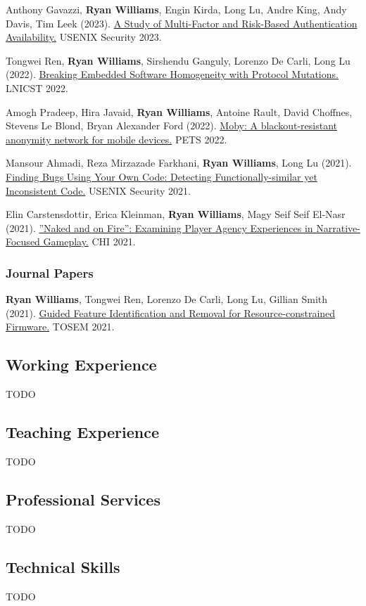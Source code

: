 \documentclass[11pt]{article}
\begin{document}
Anthony Gavazzi, \textbf{Ryan Williams}, Engin Kirda, Long Lu, Andre King, Andy Davis, Tim Leek (2023).
\href{https://www.usenix.org/system/files/sec23summer_41-gavazzi-prepub.pdf}{A Study of Multi-Factor and Risk-Based Authentication Availability.}
USENIX Security 2023.

Tongwei Ren, \textbf{Ryan Williams}, Sirshendu Ganguly, Lorenzo De Carli, Long Lu (2022).
\href{https://link.springer.com/chapter/10.1007/978-3-031-25538-0_40}{Breaking Embedded Software Homogeneity with Protocol Mutations.}
LNICST 2022.

Amogh Pradeep, Hira Javaid, \textbf{Ryan Williams}, Antoine Rault, David Choffnes, Stevens Le Blond, Bryan Alexander Ford (2022).
\href{https://infoscience.epfl.ch/record/301155}{Moby: A blackout-resistant anonymity network for mobile devices.}
PETS 2022.

Mansour Ahmadi, Reza Mirzazade Farkhani, \textbf{Ryan Williams}, Long Lu (2021).
\href{https://www.usenix.org/system/files/sec21-ahmadi.pdf}{Finding Bugs Using Your Own Code: Detecting Functionally-similar yet Inconsistent Code.}
USENIX Security 2021.

Elin Carstensdottir, Erica Kleinman, \textbf{Ryan Williams}, Magy Seif Seif El-Nasr (2021).
\href{https://dl.acm.org/doi/abs/10.1145/3411764.3445540}{”Naked and on Fire”: Examining Player Agency Experiences in Narrative-Focused Gameplay.}
CHI 2021.

\subsubsection{Journal Papers}
\textbf{Ryan Williams}, Tongwei Ren, Lorenzo De Carli, Long Lu, Gillian Smith (2021).
\href{https://dl.acm.org/doi/full/10.1145/3487568}{Guided Feature Identification and Removal for Resource-constrained Firmware.}
TOSEM 2021.

\subsection{Working Experience}
\label{sec:working-experience}
TODO

\subsection{Teaching Experience}
\label{sec:teaching-experience}
TODO

\subsection{Professional Services}
\label{sec:services}
TODO

\subsection{Technical Skills}
\label{sec:skills}
TODO
\end{document}

